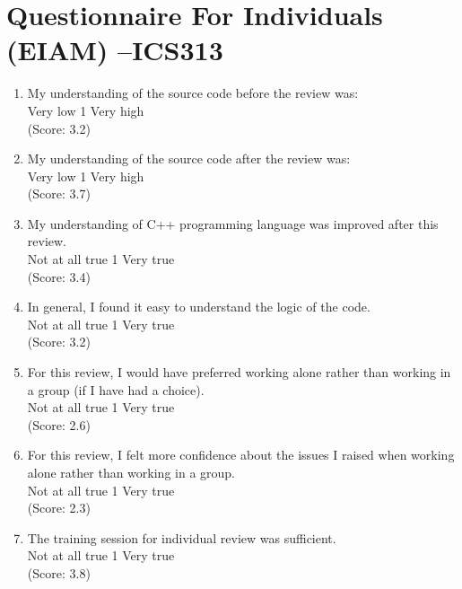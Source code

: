 
\chapter {Questionnaire For Individuals (EIAM) --ICS313}

\begin{enumerate}

\item  My understanding of the source code before the review was: 
\\
Very low \hfill 1     \hfill Very high\\
(Score: 3.2)

\item  My understanding of the source code after the review was: 
\\
Very low \hfill 1     \hfill Very high\\
(Score: 3.7)

\item  My understanding of C++ programming language was improved after
this review.  
\\
Not at all true \hfill 1     \hfill Very true\\
(Score: 3.4)

\item  In general, I found it easy to understand the logic of
the code. 
\\
Not at all true \hfill 1     \hfill Very true\\
(Score: 3.2)

\item  For this review, I would have preferred working alone rather 
than working in a group (if I have had a choice).
\\
Not at all true \hfill 1     \hfill Very true\\
(Score: 2.6)

\item  For this review, I felt more confidence about the issues I raised when 
working alone rather than working in a group.
\\
Not at all true \hfill 1     \hfill Very true\\
(Score: 2.3)

\item  The training session for individual review was sufficient.
\\
Not at all true \hfill 1     \hfill Very true\\
(Score: 3.8)


\end{enumerate}
